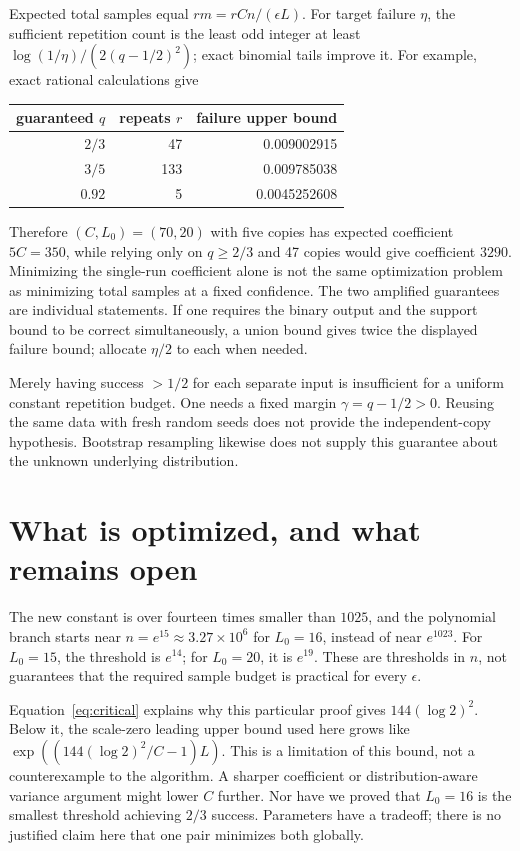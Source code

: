 \documentclass[10pt]{article}
\begin{document}
Expected total samples equal $rm=rCn/(\epsilon L)$.
For target failure $\eta$, the sufficient repetition count is the least odd
integer at least $\log(1/\eta)/(2(q-1/2)^2)$; exact binomial tails improve it.
For example, exact rational calculations give
\begin{center}
\begin{tabular}{rrr}
\toprule
guaranteed $q$ & repeats $r$ & failure upper bound\\
\midrule
$2/3$&47&0.009002915\\
$3/5$&133&0.009785038\\
$0.92$&5&0.0045252608\\
\bottomrule
\end{tabular}
\end{center}
Therefore $(C,L_0)=(70,20)$ with five copies has expected coefficient
$5C=350$, while relying only on $q\ge2/3$ and 47 copies would give
coefficient $3290$. Minimizing the single-run coefficient alone is not the
same optimization problem as minimizing total samples at a fixed confidence.
The two amplified guarantees are individual statements. If one requires
the binary output and the support bound to be correct simultaneously, a
union bound gives twice the displayed failure bound; allocate $\eta/2$ to
each when needed.

Merely having success $>1/2$ for each separate input is insufficient for a
uniform constant repetition budget. One needs a fixed margin
$\gamma=q-1/2>0$. Reusing the same data with fresh random seeds does not
provide the independent-copy hypothesis. Bootstrap resampling likewise does
not supply this guarantee about the unknown underlying distribution.

\section{What is optimized, and what remains open}
The new constant is over fourteen times smaller than $1025$, and the
polynomial branch starts near $n=e^{15}\approx3.27\times10^6$ for $L_0=16$,
instead of near $e^{1023}$. For $L_0=15$, the threshold is $e^{14}$;
for $L_0=20$, it is $e^{19}$. These are thresholds in $n$, not guarantees
that the required sample budget is practical for every $\epsilon$.

Equation~\eqref{eq:critical} explains why this particular proof gives
$144(\log2)^2$. Below it, the scale-zero leading upper bound used here grows
like $\exp((144(\log2)^2/C-1)L)$. This is a limitation of this bound, not a
counterexample to the algorithm. A sharper coefficient or distribution-aware
variance argument might lower $C$ further. Nor have we proved that $L_0=16$
is the smallest threshold achieving $2/3$ success. Parameters have a tradeoff;
there is no justified claim here that one pair minimizes both globally.
\end{document}
